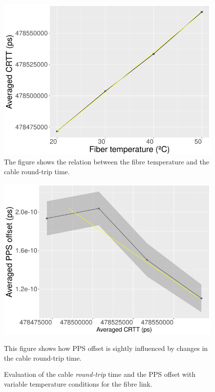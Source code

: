

	
\begin{figure}[t]
	\centering
	\includegraphics[width=0.7\linewidth]{img/crttvstemp}
	\caption[CRTT vs. Fiber temperature]{The figure shows the relation 
	between the fibre temperature and the cable round-trip time.}
	\label{fig:crttvstemp}
\end{figure}

\begin{figure}[t]
	\centering
	\includegraphics[width=0.7\linewidth]{img/ppsvscrtt}
	\caption[PPS offset vs. CRTT]{This figure shows how PPS offset is 
	sightly influenced by changes in the cable round-trip time.}
	\label{fig:ppsvscrtt}
	\caption{Evaluation of the cable \textit{round-trip} time and the PPS 
	offset with variable temperature conditions for the fibre link.}
\end{figure}

